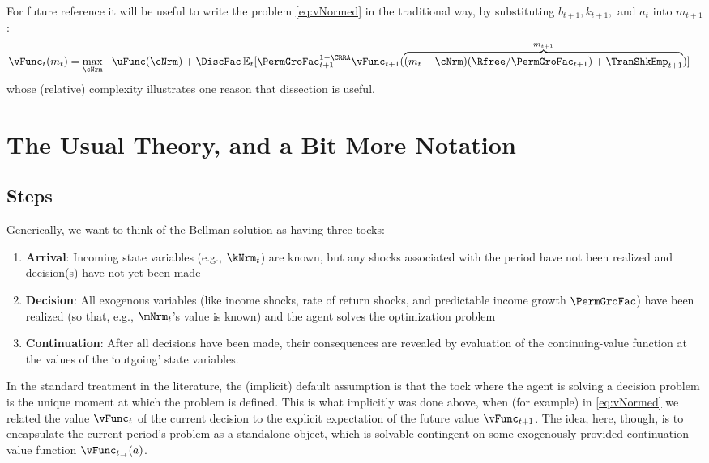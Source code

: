 \documentclass[titlepage, headings=optiontotocandhead]{Resources/texmf-local/tex/latex/econtex}
\begin{document}
For future reference it will be useful to write the problem \eqref{eq:vNormed} in the traditional way, by substituting ${b}_{t+1},{k}_{t+1},$ and ${a}_{t}$ into ${m}_{t+1}$:
\begin{equation}\begin{gathered}\begin{aligned}
      {\vFunc}_{t}({m}_{t}) & = \max_{\cNrm} ~~ \uFunc(\cNrm)+
      {\DiscFac}\Ex_{t}[ \PermGroFac_{t+1}^{1-\CRRA}{\vFunc}_{t+1}(\overbrace{({m}_{t}-\cNrm)(\Rfree/\PermGroFac_{t+1})+\TranShkEmp_{t+1}}^{{m}_{t+1}})] \label{eq:vusual}
    \end{aligned}\end{gathered}\end{equation}
whose (relative) complexity illustrates one reason that dissection is useful.



\hypertarget{the-usual-theory}{}
\section{The Usual Theory, and a Bit More Notation}\label{sec:the-usual-theory}


\subsection{Steps}

Generically, we want to think of the Bellman solution as having three {tocks}:
\begin{enumerate}
\item \textbf{Arrival}: Incoming state variables (e.g., $\kNrm_{t}$) are known, but any shocks associated with the period have not been realized and decision(s) have not yet been made
\item \textbf{Decision}: All exogenous variables (like income shocks, rate of return shocks, and predictable income growth $\PermGroFac$) have been realized (so that, e.g., $\mNrm_{t}$'s value is known) and the agent solves the optimization problem
\item \textbf{Continuation}: After all decisions have been made, their consequences are revealed by evaluation of the continuing-value function at the values of the `outgoing' state variables.
\end{enumerate}

In the standard treatment in the literature, the (implicit) default assumption is that the {tock} where the agent is solving a decision problem is the unique moment at which the problem is defined.  This is what implicitly was done above, when (for example) in \eqref{eq:vNormed} we related the value $\vFunc_{t}$ of the current decision to the explicit expectation of the future value $\vFunc_{t+1}$.  The idea, here, though, is to encapsulate the current period's problem as a standalone object, which is solvable contingent on some exogenously-provided continuation-value function $\vFunc_{t_\rightarrow}({a})$.
\end{document}
